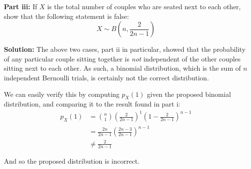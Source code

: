 \documentclass{article}
\begin{document}
\bigskip

\noindent\textbf{Part iii:} If $X$ is the total number of couples who are seated next to each other, show that the following statement is false:
\begin{equation*}
    X\sim B\left(n,\frac{2}{2n-1}\right)
\end{equation*}
\bigskip

\noindent\textbf{Solution:} The above two cases, part ii in particular, showed that the probability of any particular couple sitting together is \textit{not} independent of the other couples sitting next to each other. As such, a binomial distribution, which is the sum of $n$ independent Bernoulli trials, is certainly not the correct distribution.

We can easily verify this by computing $p_X(1)$ given the proposed binomial distribution, and comparing it to the result found in part i:
\begin{align*}
    p_X(1)&=\binom{n}{1}\left(\frac{2}{2n-1}\right)^1\left(1-\frac{2}{2n-1}\right)^{n-1}\tag{binomial distribution}\\
    &=\frac{2n}{2n-1}\left(\frac{2n-3}{2n-1}\right)^{n-1}\\
    &\not=\frac{2}{2n-1}\tag{part i}
\end{align*}

And so the proposed distribution is incorrect.



\bigskip
\end{document}
